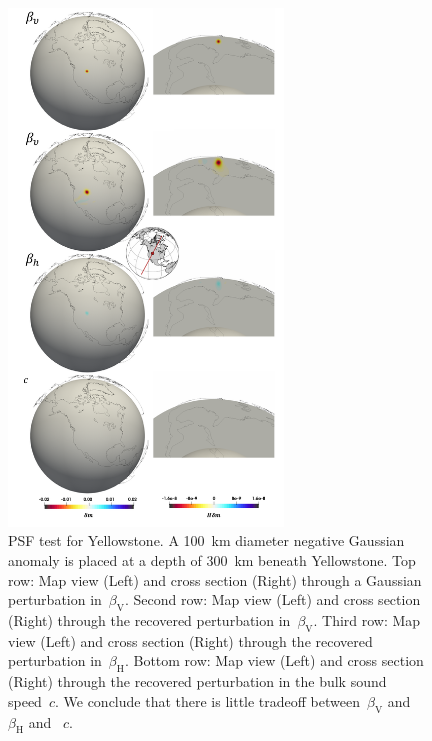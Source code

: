 \documentclass[extra,mreferee]{gji}
\begin{document}
\begin{figure}
  \centering
  \includegraphics[width=0.65\textwidth]{figures/psf/yellowstone.pdf}
  \caption{\small{PSF test for Yellowstone.
  A 100~km diameter negative Gaussian anomaly is placed at a depth of 300~km beneath Yellowstone.
  Top row: Map view (Left) and cross section (Right) through a Gaussian perturbation in~$\beta_\mathrm{V}$.
  Second row: Map view (Left) and cross section (Right) through the recovered perturbation in~$\beta_\mathrm{V}$.
  Third row: Map view (Left) and cross section (Right) through the recovered perturbation in~$\beta_\mathrm{H}$.
  Bottom row: Map view (Left) and cross section (Right) through the recovered perturbation in the bulk sound speed~$c$. We conclude that there is little tradeoff between~$\beta_\mathrm{V}$ and~$\beta_\mathrm{H}$ and ~$c$.
  }}
  \label{fig:psf_yellowstone}
\end{figure}
\end{document}
